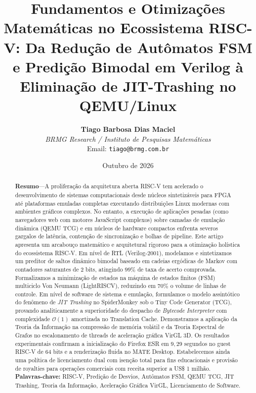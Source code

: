 \documentclass[10pt,twocolumn]{article}
\title{\textbf{Fundamentos e Otimiza\c{c}\~oes Matem\'aticas no Ecossistema RISC-V: Da Redu\c{c}\~ao de Aut\^omatos FSM e Predi\c{c}\~ao Bimodal em Verilog \`a Elimina\c{c}\~ao de JIT-Trashing no QEMU/Linux}}
\author{
    \textbf{Tiago Barbosa Dias Maciel} \\
    \textit{BRMG Research / Instituto de Pesquisas Matem\'aticas} \\
    Email: \texttt{tiago@brmg.com.br}
}
\date{Outubro de 2026}
\begin{document}
\maketitle
\balance

\begin{abstract}
\textbf{Resumo}---A prolifera\c{c}\~ao da arquitetura aberta RISC-V tem acelerado o desenvolvimento de sistemas computacionais desde n\'ucleos sintetiz\'aveis para FPGA at\'e plataformas emuladas completas executando distribui\c{c}\~oes Linux modernas com ambientes gr\'aficos complexos. No entanto, a execu\c{c}\~ao de aplica\c{c}\~oes pesadas (como navegadores web com motores JavaScript complexos) sobre camadas de emula\c{c}\~ao din\^amica (QEMU TCG) e em n\'ucleos de hardware compactos enfrenta severos gargalos de lat\^encia, conten\c{c}\~ao de sincroniza\c{c}\~ao e bolhas de pipeline. Este artigo apresenta um arcabou\c{c}o matem\'atico e arquitetural rigoroso para a otimiza\c{c}\~ao hol\'istica do ecossistema RISC-V. Em n\'ivel de RTL (Verilog-2001), modelamos e sintetizamos um preditor de saltos din\^amico bimodal baseado em cadeias erg\'odicas de Markov com contadores saturantes de 2 bits, atingindo $99\%$ de taxa de acerto comprovada. Formalizamos a minimiza\c{c}\~ao de estados na m\'aquina de estados finitos (FSM) multiciclo Von Neumann (LightRISCV), reduzindo em $70\%$ o volume de linhas de controle. Em n\'ivel de software de sistema e emula\c{c}\~ao, formulamos o modelo assint\'otico do fen\^omeno de \textit{JIT Trashing} no SpiderMonkey sob o Tiny Code Generator (TCG), provando analiticamente a superioridade do despacho de \textit{Bytecode Interpreter} com complexidade $\mathcal{O}(1)$ amortizada no Translation Cache. Demonstramos a aplica\c{c}\~ao da Teoria da Informa\c{c}\~ao na compress\~ao de mem\'oria vol\'atil e da Teoria Espectral de Grafos no escalonamento de threads de acelera\c{c}\~ao gr\'afica VirGL 3D. Os resultados experimentais confirmam a inicializa\c{c}\~ao do Firefox ESR em $9{,}29$ segundos no guest RISC-V de 64 bits e a renderiza\c{c}\~ao fluida no MATE Desktop. Estabelecemos ainda uma pol\'itica de licenciamento dual com isen\c{c}\~ao total para fins educacionais e provis\~ao de royalties para opera\c{c}\~oes comerciais com receita superior a US\$ 1 milh\~ao.\\

\noindent\textbf{Palavras-chave:} RISC-V, Predi\c{c}\~ao de Desvios, Aut\^omatos FSM, QEMU TCG, JIT Trashing, Teoria da Informa\c{c}\~ao, Acelera\c{c}\~ao Gr\'afica VirGL, Licenciamento de Software.
\end{abstract}
\end{document}

